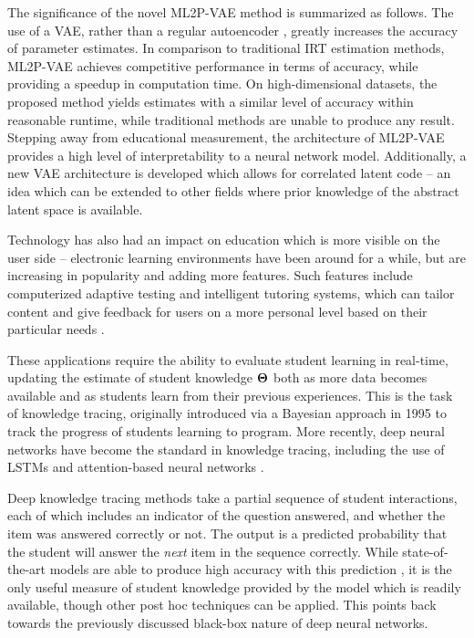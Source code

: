 The significance of the novel ML2P-VAE method is summarized as follows. The use of a VAE, rather than a regular autoencoder \cite{guo2017}, greatly increases the accuracy of parameter estimates. In comparison to traditional IRT estimation methods, ML2P-VAE achieves competitive performance in terms of accuracy, while providing a speedup in computation time. On high-dimensional datasets, the proposed method yields estimates with a similar level of accuracy within reasonable runtime, while traditional methods are unable to produce any result. Stepping away from educational measurement, the architecture of ML2P-VAE provides a high level of interpretability to a neural network model. Additionally, a new VAE architecture is developed which allows for correlated latent code -- an idea which can be extended to other fields where prior knowledge of the abstract latent space is available.

Technology has also had an impact on education which is more visible on the user side -- electronic learning environments have been around for a while, but are increasing in popularity and adding more features. Such features include computerized adaptive testing and intelligent tutoring systems, which can tailor content and give feedback for users on a more personal level based on their particular needs \cite{meijer1999, ong2003}.

These applications require the ability to evaluate student learning in real-time, updating the estimate of student knowledge $\boldsymbol{\Theta}$ both as more data becomes available and as students learn from their previous experiences. This is the task of knowledge tracing, originally introduced via a Bayesian approach in 1995 \cite{corbett1995} to track the progress of students learning to program. More recently, deep neural networks have become the standard in knowledge tracing, including the use of LSTMs \cite{piech2015} and attention-based neural networks \cite{pandey2019}.

Deep knowledge tracing methods take a partial sequence of student interactions, each of which includes an indicator of the question answered, and whether the item was answered correctly or not. The output is a predicted probability that the student will answer the \textit{next} item in the sequence correctly. While state-of-the-art models are able to produce high accuracy with this prediction \cite{zhang2017}, it is the only useful measure of student knowledge provided by the model which is readily available, though other post hoc techniques can be applied. This points back towards the previously discussed black-box nature of deep neural networks.

